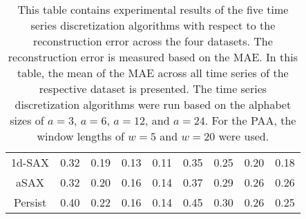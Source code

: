 \begin{table}[htb]
\begin{tabular}{ccccccccc}
\ac{1d-SAX} & 0.32 & 0.19 & 0.13 & 0.11 & 0.35 & 0.25 & 0.20 & 0.18 \\
\ac{aSAX} & 0.32 & 0.20 & 0.16 & 0.14 & 0.37 & 0.29 & 0.26 & 0.26 \\
Persist & 0.40 & 0.22 & 0.16 & 0.14 & 0.45 & 0.30 & 0.26 & 0.25 \\
\bottomrule
\end{tabular}
\vspace*{0.5cm}
\caption[Reconstruction Error - Evaluation: Alphabet Size]{This table contains experimental results of the five time series discretization algorithms with respect to the reconstruction error across the four datasets. The reconstruction error is measured based on the \ac{MAE}. In this table, the mean of the \ac{MAE} across all time series of the respective dataset is presented. The time series discretization algorithms were run based on the alphabet sizes of $a = 3$, $a = 6$, $a = 12$, and $a = 24$. For the \ac{PAA}, the window lengths of $w = 5$ and $w = 20$ were used.}
\label{tab:recon_error_alphabet_size}
\end{table}